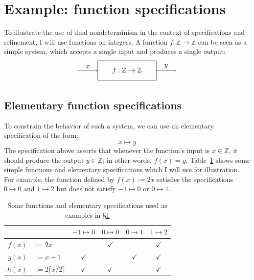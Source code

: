 \documentclass[11pt,oneside]{book}
\theoremstyle{definition}
\begin{document}
\section{Example: function specifications} \label{sec:fspec} %

To illustrate the use of dual nondeterminism
in the context of specifications and refinement,
I will use functions on integers.
A function $f : \mathbb{Z} \rightarrow \mathbb{Z}$
can be seen as a simple system,
which accepts a single input and produces a single output:
\[
  \begin{tikzpicture}[scale=0.5]
    \draw (-3, -1) rectangle (3, 1);
    \node at (0,0) {$f : \mathbb{Z} \rightarrow \mathbb{Z}$};
    \draw[->] (-5,0) -- node[above] {$x$} (-3,0);
    \draw[->] (3,0) -- node[above] {$y$} (5,0);
  \end{tikzpicture}
\]

\subsection{Elementary function specifications} %

To constrain the behavior of such a system,
we can use an elementary specification of the form:
\[
  x \mapsto y
\]
The specification above asserts that
whenever the function's input is $x \in \mathbb{Z}$,
it should produce the output $y \in \mathbb{Z}$;
in other words, $f(x) = y$.
Table~\ref{tbl:funspec}
shows some simple functions
and elementary specifications
which I will use for illustration.
For example,
the function defined by $f(x) := 2x$
satisfies the specifications
$0 \mapsto 0$ and $1 \mapsto 2$
but does not satisfy $-1 \mapsto 0$ or $0 \mapsto 1$.

\begin{table}
  \centering
  \begin{tabular}{r@{}lcccc}
    \hline & &
      $-1 \mapsto 0$ &
      $0 \mapsto 0$ &
      $0 \mapsto 1$ &
      $1 \mapsto 2$ \\
    \hline
      $f(x)$ & ${} := 2x$ & & $\checkmark$ & & $\checkmark$ \\
      $g(x)$ & ${} := x + 1$ & $\checkmark$ & & $\checkmark$ & $\checkmark$ \\
      $h(x)$ & ${} := 2 \lceil x / 2 \rceil$ & $\checkmark$ & $\checkmark$ & & $\checkmark$ \\
    \hline
  \end{tabular}
  \caption{%
    Some functions and elementary specifications
    used as examples in \S\ref{sec:fspec}}
  \label{tbl:funspec}
\end{table}
\end{document}
